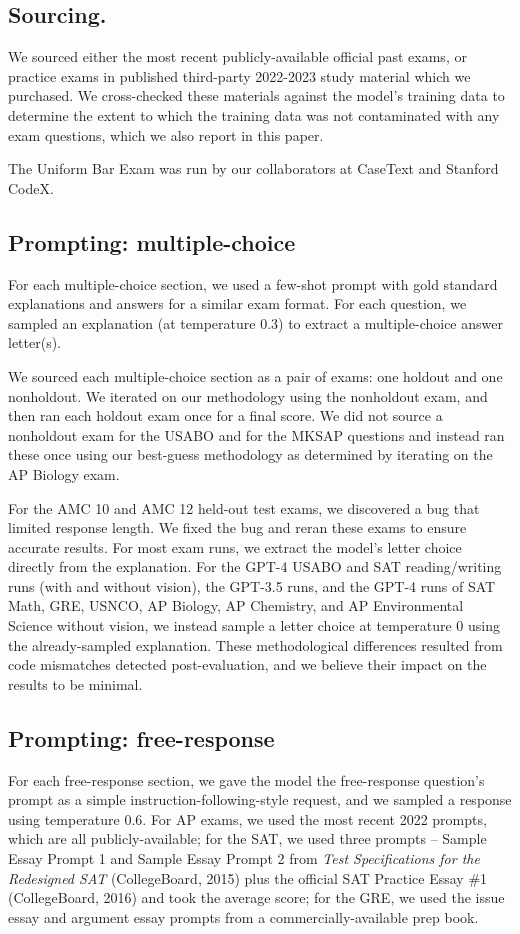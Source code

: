 \documentclass{article}
\begin{document}
\subsection{Sourcing.} We sourced either the most recent publicly-available official past exams, or practice exams in published third-party 2022-2023 study material which we purchased. We cross-checked these materials against the model's training data to determine the extent to which the training data was not contaminated with any exam questions, which we also report in this paper.

The Uniform Bar Exam was run by our collaborators at CaseText and Stanford CodeX.

\subsection{Prompting: multiple-choice} \label{appendix:exam_mcq_prompting} For each multiple-choice section, we used a few-shot prompt with gold standard explanations and answers for a similar exam format. For each question, we sampled an explanation (at temperature 0.3) to extract a multiple-choice answer letter(s). 

We sourced each multiple-choice section as a pair of exams: one holdout and one nonholdout. We iterated on our methodology using the nonholdout exam, and then ran each holdout exam once for a final score. We did not source a nonholdout exam for the USABO and for the MKSAP questions and instead ran these once using our best-guess methodology as determined by iterating on the AP Biology exam.

For the AMC 10 and AMC 12 held-out test exams, we discovered a bug that limited response length. We fixed the bug and reran these exams to ensure accurate results. For most exam runs, we extract the model's letter choice directly from the explanation. For the GPT-4 USABO and SAT reading/writing runs (with and without vision), the GPT-3.5 runs, and the GPT-4 runs of SAT Math, GRE, USNCO, AP Biology, AP Chemistry, and AP Environmental Science without vision, we instead sample a letter choice at temperature 0 using the already-sampled explanation. These methodological differences resulted from code mismatches detected post-evaluation, and we believe their impact on the results to be minimal.

\subsection{Prompting: free-response}
For each free-response section, we gave the model the free-response question's prompt as a simple instruction-following-style request, and we sampled a response using temperature 0.6. For AP exams, we used the most recent 2022 prompts, which are all publicly-available; for the SAT, we used three prompts -- Sample Essay Prompt 1 and Sample Essay Prompt 2 from \textit{Test Specifications for the Redesigned SAT} (CollegeBoard, 2015) plus the official SAT Practice Essay \#1 (CollegeBoard, 2016) and took the average score; for the GRE, we used the issue essay and argument essay prompts from a commercially-available prep book.
\end{document}
